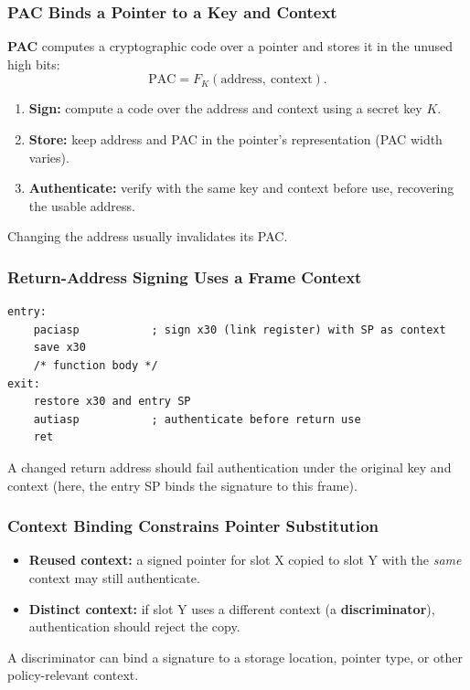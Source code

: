 \documentclass[hidelinks]{article}
\begin{document}
\subsubsection{PAC Binds a Pointer to a Key and Context}

\textbf{PAC} computes a cryptographic code over a pointer and stores it in the unused high bits:
\[
\text{PAC} = F_K(\text{address},\ \text{context}).
\]
\begin{enumerate}
    \item \textbf{Sign:} compute a code over the address and context using a secret key $K$.
    \item \textbf{Store:} keep address and PAC in the pointer's representation (PAC width varies).
    \item \textbf{Authenticate:} verify with the same key and context before use, recovering the usable address.
\end{enumerate}
Changing the address usually invalidates its PAC.

\subsubsection{Return-Address Signing Uses a Frame Context}

\begin{lstlisting}[language={[x86masm]Assembler}]
entry:
    paciasp           ; sign x30 (link register) with SP as context
    save x30
    /* function body */
exit:
    restore x30 and entry SP
    autiasp           ; authenticate before return use
    ret
\end{lstlisting}
A changed return address should fail authentication under the original key and context (here, the entry SP binds the signature to this frame).

\subsubsection{Context Binding Constrains Pointer Substitution}

\begin{itemize}
    \item \textbf{Reused context:} a signed pointer for slot X copied to slot Y with the \emph{same} context may still authenticate.
    \item \textbf{Distinct context:} if slot Y uses a different context (a \textbf{discriminator}), authentication should reject the copy.
\end{itemize}
A discriminator can bind a signature to a storage location, pointer type, or other policy-relevant context.
\end{document}
